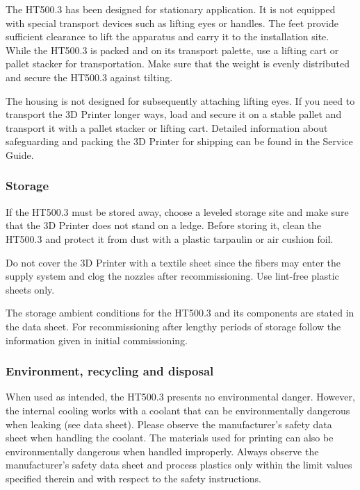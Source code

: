 The HT500.3 has been designed for stationary application. It is not equipped with special transport devices such as lifting eyes or handles. The feet provide sufficient clearance to lift the apparatus and carry it to the installation site.
While the HT500.3 is packed and on its transport palette, use a lifting cart or pallet stacker for transportation. Make sure that the weight is evenly distributed and secure the HT500.3 against tilting. 

\begin{info}
  The housing is not designed for subsequently attaching lifting eyes. If you need to transport the 3D Printer longer ways, load and secure it on a stable pallet and transport it with a pallet stacker or lifting cart.
  Detailed information about safeguarding and packing the 3D Printer for shipping can be found in the Service Guide.
\end{info}


\subsubsection{Storage}

If the HT500.3 must be stored away, choose a leveled storage site and make sure that the 3D Printer does not stand on a ledge.
Before storing it, clean the HT500.3 and protect it from dust with a plastic tarpaulin or air cushion foil.

\begin{notice}
  Do not cover the 3D Printer with a textile sheet since the fibers may enter the supply system and clog the nozzles after recommissioning. Use lint-free plastic sheets only.
\end{notice}

The storage ambient conditions for the HT500.3 and its components are stated in the data sheet. For recommissioning after lengthy periods of storage follow the information given in initial commissioning. 


\subsubsection{Environment, recycling and disposal}

When used as intended, the HT500.3 presents no environmental danger.
However, the internal cooling works with a coolant that can be environmentally dangerous when leaking (see data sheet). Please observe the manufacturer's safety data sheet when handling the coolant.
The materials used for printing can also be environmentally dangerous when handled improperly. Always observe the manufacturer's safety data sheet and process plastics only within the limit values specified therein and with respect to the safety instructions.

